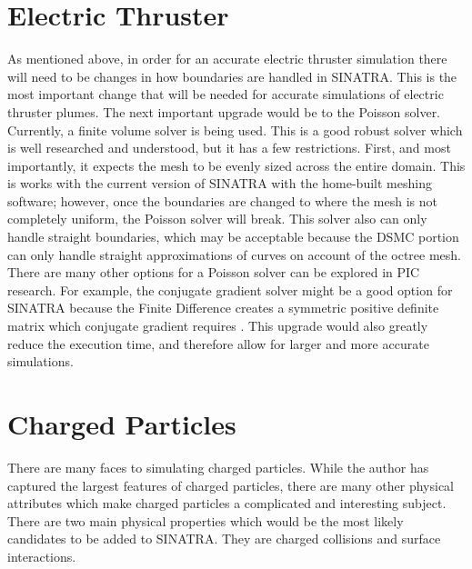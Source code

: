 \section{Electric Thruster}

As mentioned above, in order for an accurate electric thruster simulation there will need to be changes in how boundaries are handled in SINATRA. This is the most important change that will be needed for accurate simulations of electric thruster plumes. The next important upgrade would be to the Poisson solver. Currently, a finite volume solver is being used. This is a good robust solver which is well researched and understood, but it has a few restrictions. First, and most importantly, it expects the mesh to be evenly sized across the entire domain. This is works with the current version of SINATRA with the home-built meshing software; however, once the boundaries are changed to where the mesh is not completely uniform, the Poisson solver will break. This solver also can only handle straight boundaries, which may be acceptable because the DSMC portion can only handle straight approximations of curves on account of the octree mesh. There are many other options for a Poisson solver can be explored in PIC research. For example, the conjugate gradient solver might be a good option for SINATRA because the Finite Difference creates a symmetric positive definite matrix which conjugate gradient requires \cite{FD_GS}. This upgrade would also greatly reduce the execution time, and therefore allow for larger and more accurate simulations. \par

\section{Charged Particles}

There are many faces to simulating charged particles. While the author has captured the largest features of charged particles, there are many other physical attributes which make charged particles a complicated and interesting subject. There are two main physical properties which would be the most likely candidates to be added to SINATRA. They are charged collisions and surface interactions. \par

